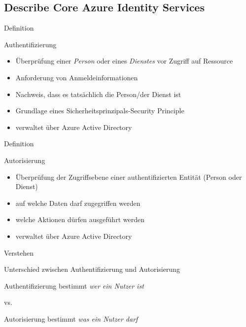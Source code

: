 \documentclass{scrartcl}
\newenvironment{flashcard}[2][]{%
    #1
    \vfill
    \centerline{\Large{#2}}
    \vfill
\newpage
}
{\newpage}
\newcommand{\subsectioncard}[1]{
    \vspace*{\stretch{1}}
    \subsection{#1}
    \vspace*{\stretch{1}}
    \pagebreak
}
\begin{document}
    \subsectioncard{Describe Core Azure Identity Services}

    \begin{flashcard}[Definition]{Authentifizierung}
        \begin{itemize}
            \item Überprüfung einer \emph{Person} oder eines \emph{Dienstes} vor Zugriff auf Ressource
            \item Anforderung von Anmeldeinformationen
            \item Nachweis, dass es tatsächlich die Person/der Dienst ist
            \item Grundlage eines Sicherheitsprinzipals-Security Principle
            \item verwaltet über Azure Active Directory
        \end{itemize}
    \end{flashcard}

    \begin{flashcard}[Definition]{Autorisierung}
        \begin{itemize}
            \item Überprüfung der Zugriffsebene einer authentifizierten Entität (Person oder Dienst)
            \item auf welche Daten darf zugegriffen werden
            \item welche Aktionen dürfen ausgeführt werden
            \item verwaltet über Azure Active Directory
        \end{itemize}
    \end{flashcard}

    \begin{flashcard}[Verstehen]{Unterschied zwischen Authentifizierung und Autorisierung}
        \begin{center}
            Authentifizierung bestimmt \emph{wer ein Nutzer ist}
            \vspace{5mm}

            vs.
            \vspace{5mm}

            Autorisierung bestimmt \emph{was ein Nutzer darf}
        \end{center}
    \end{flashcard}
\end{document}
